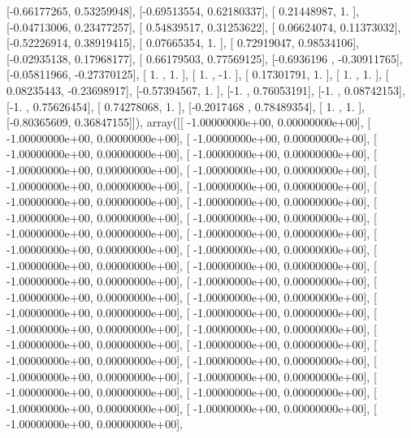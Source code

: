 \documentclass{article}
\begin{document}
       [-0.66177265,  0.53259948],
       [-0.69513554,  0.62180337],
       [ 0.21448987,  1.        ],
       [-0.04713006,  0.23477257],
       [ 0.54839517,  0.31253622],
       [ 0.06624074,  0.11373032],
       [-0.52226914,  0.38919415],
       [ 0.07665354,  1.        ],
       [ 0.72919047,  0.98534106],
       [-0.02935138,  0.17968177],
       [ 0.66179503,  0.77569125],
       [-0.6936196 , -0.30911765],
       [-0.05811966, -0.27370125],
       [ 1.        ,  1.        ],
       [ 1.        , -1.        ],
       [ 0.17301791,  1.        ],
       [ 1.        ,  1.        ],
       [ 0.08235443, -0.23698917],
       [-0.57394567,  1.        ],
       [-1.        ,  0.76053191],
       [-1.        ,  0.08742153],
       [-1.        ,  0.75626454],
       [ 0.74278068,  1.        ],
       [-0.2017468 ,  0.78489354],
       [ 1.        ,  1.        ],
       [-0.80365609,  0.36847155]]), array([[ -1.00000000e+00,   0.00000000e+00],
       [ -1.00000000e+00,   0.00000000e+00],
       [ -1.00000000e+00,   0.00000000e+00],
       [ -1.00000000e+00,   0.00000000e+00],
       [ -1.00000000e+00,   0.00000000e+00],
       [ -1.00000000e+00,   0.00000000e+00],
       [ -1.00000000e+00,   0.00000000e+00],
       [ -1.00000000e+00,   0.00000000e+00],
       [ -1.00000000e+00,   0.00000000e+00],
       [ -1.00000000e+00,   0.00000000e+00],
       [ -1.00000000e+00,   0.00000000e+00],
       [ -1.00000000e+00,   0.00000000e+00],
       [ -1.00000000e+00,   0.00000000e+00],
       [ -1.00000000e+00,   0.00000000e+00],
       [ -1.00000000e+00,   0.00000000e+00],
       [ -1.00000000e+00,   0.00000000e+00],
       [ -1.00000000e+00,   0.00000000e+00],
       [ -1.00000000e+00,   0.00000000e+00],
       [ -1.00000000e+00,   0.00000000e+00],
       [ -1.00000000e+00,   0.00000000e+00],
       [ -1.00000000e+00,   0.00000000e+00],
       [ -1.00000000e+00,   0.00000000e+00],
       [ -1.00000000e+00,   0.00000000e+00],
       [ -1.00000000e+00,   0.00000000e+00],
       [ -1.00000000e+00,   0.00000000e+00],
       [ -1.00000000e+00,   0.00000000e+00],
       [ -1.00000000e+00,   0.00000000e+00],
       [ -1.00000000e+00,   0.00000000e+00],
       [ -1.00000000e+00,   0.00000000e+00],
       [ -1.00000000e+00,   0.00000000e+00],
       [ -1.00000000e+00,   0.00000000e+00],
       [ -1.00000000e+00,   0.00000000e+00],
       [ -1.00000000e+00,   0.00000000e+00],
       [ -1.00000000e+00,   0.00000000e+00],
       [ -1.00000000e+00,   0.00000000e+00],
       [ -1.00000000e+00,   0.00000000e+00],
       [ -1.00000000e+00,   0.00000000e+00],
       [ -1.00000000e+00,   0.00000000e+00],
\end{document}
